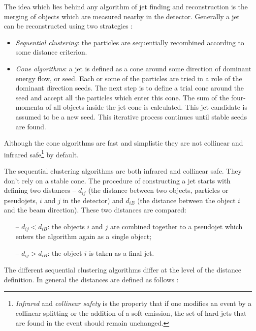 The idea which lies behind any algorithm of jet finding and reconstruction is the merging of objects which are measured nearby in the detector.
Generally a jet can be reconstructed using two strategies \cite{Salam:2007xv}:

\begin{itemize}
 \item \textit{Sequential clustering}: the particles are sequentially recombined according to some distance criterion.
 \item \textit{Cone algorithms}: a jet is defined as a cone around some direction of dominant energy flow, or seed. Each or some of the particles are tried 
 in a role of the dominant direction seeds. The next step is to define a trial cone around the seed and accept all the particles which enter this cone.
 The sum of the four-momenta of all objects inside the jet cone is calculated. This jet candidate is assumed to be a new seed. This iterative process continues
 until stable seeds are found.
\end{itemize}

Although the cone algorithms are fast and simplistic they are not collinear and infrared safe\footnote{\textit{Infrared} and \textit{collinear safety} 
is the property that if one modifies an event by a collinear splitting or the addition of a soft emission, the set of hard jets that are found in the event 
should remain unchanged.} by default.

The sequential clustering algorithms are both infrared and collinear safe. They don't rely on a stable cone. The procedure of constructing
a jet starts with defining two distances -- $d_{ij}$ (the distance between two objects, particles or pseudojets, $i$ and $j$ in the detector) and $d_{iB}$ (the distance between the object $i$
and the beam direction). These two distances are compared:

\begin{itemize}
 \item [--] $d_{ij} < d_{iB}$: the objects $i$ and $j$ are combined together to a pseudojet which enters the algorithm again as a single object;
 \item [--] $d_{ij} > d_{iB}$: the object $i$ is taken as a final jet.
\end{itemize}

The different sequential clustering algorithms differ at the level of the distance definition. In general the distances are defined as follows \cite{Cacciari:2008gp}:


